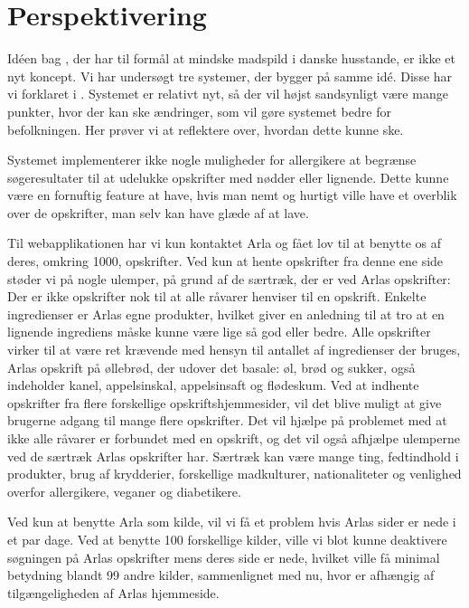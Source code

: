 \section{Perspektivering}
\label{sec:perspektivering}
Idéen bag \Foodl{}, der har til formål at mindske madspild i danske husstande, er ikke et nyt koncept. Vi har undersøgt tre systemer, der bygger på samme idé. Disse har vi forklaret i . Systemet er relativt nyt, så der vil højst sandsynligt være mange punkter, hvor der kan ske ændringer, som vil gøre systemet bedre for befolkningen. Her prøver vi at reflektere over, hvordan dette kunne ske.

Systemet \Foodl{} implementerer ikke nogle muligheder for \fx allergikere at begrænse søgeresultater til \fx at udelukke opskrifter med nødder eller lignende. Dette kunne være en fornuftig feature at have, hvis man nemt og hurtigt ville have et overblik over de opskrifter, man selv kan have glæde af at lave.

Til webapplikationen \Foodl{} har vi kun kontaktet Arla og fået lov til at benytte os af deres, omkring 1000, opskrifter. Ved kun at hente opskrifter fra denne ene side støder vi på nogle ulemper, på grund af de særtræk, der er ved Arlas opskrifter: Der er ikke opskrifter nok til at alle råvarer henviser til en opskrift. Enkelte ingredienser er Arlas egne produkter, hvilket giver en anledning til at tro at en lignende ingrediens måske kunne være lige så god eller bedre. Alle opskrifter virker til at være ret krævende med hensyn til antallet af ingredienser der bruges, \fx Arlas opskrift på øllebrød, der udover det basale: øl, brød og sukker, også indeholder kanel, appelsinskal, appelsinsaft og flødeskum. Ved at indhente opskrifter fra flere forskellige opskriftshjemmesider, vil det blive muligt at give brugerne adgang til mange flere opskrifter. Det vil hjælpe på problemet med at ikke alle råvarer er forbundet med en opskrift, og det vil også afhjælpe ulemperne ved de særtræk Arlas opskrifter har. Særtræk kan være mange ting, \fx fedtindhold i produkter, brug af krydderier, forskellige madkulturer, nationaliteter og venlighed overfor allergikere, veganer og diabetikere.

Ved kun at benytte Arla som kilde, vil vi få et problem hvis Arlas sider er nede i et par dage. Ved at benytte 100 forskellige kilder, ville vi blot kunne deaktivere søgningen på Arlas opskrifter mens deres side er nede, hvilket ville få minimal betydning blandt 99 andre kilder, sammenlignet med nu, hvor \Foodl{} er afhængig af tilgængeligheden af Arlas hjemmeside.

